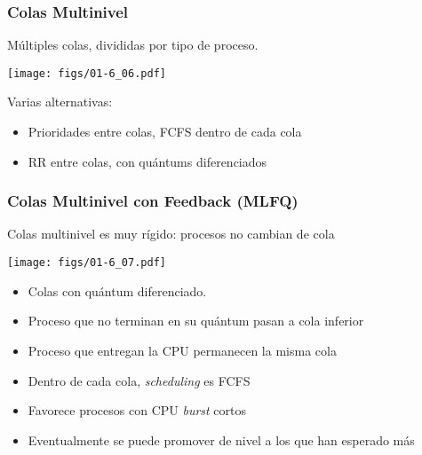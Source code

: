 \documentclass[letter]{beamer}
\begin{document}
\begin{frame}
  \frametitle{Colas Multinivel}

  Múltiples colas, divididas por tipo de proceso.
  
  \begin{center}
    \texttt{[image: figs/01-6\_06.pdf]}
  \end{center}
  
  Varias alternativas:
  \begin{itemize}
    \item Prioridades entre colas, FCFS dentro de cada cola
    \item RR entre colas, con quántums diferenciados
  \end{itemize}

\end{frame}
\begin{frame}
  \frametitle{Colas Multinivel con Feedback (MLFQ)}

  Colas multinivel es muy rígido: procesos no cambian de cola

  \begin{center}
    \texttt{[image: figs/01-6\_07.pdf]}
  \end{center}
  
  \begin{itemize}
    \item Colas con quántum diferenciado. 
    \item Proceso que no terminan en su quántum pasan a cola inferior
    \item Proceso que entregan la CPU permanecen la misma cola
    \item Dentro de cada cola, {\em scheduling} es FCFS
    \item Favorece procesos con CPU {\em burst} cortos
    \item Eventualmente se puede promover de nivel a los que han esperado más
  \end{itemize}

\end{frame}
\end{document}
